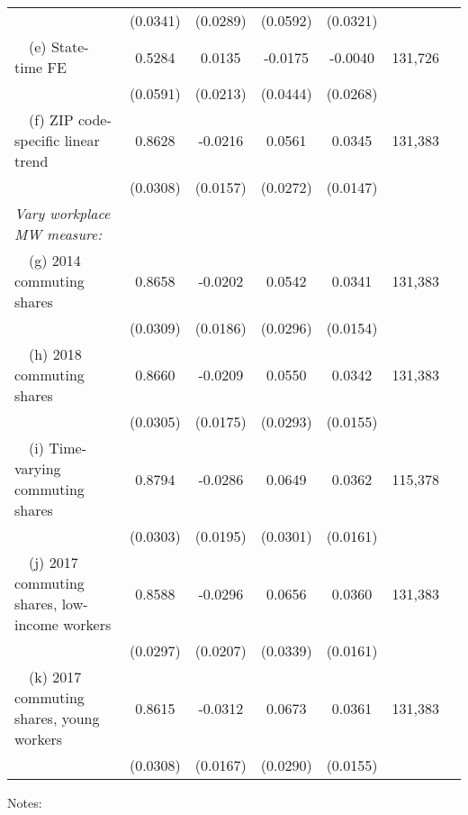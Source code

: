 \begin{table}
\begin{tabular}{@{}lcccccc@{}}
                                                             & (0.0341) & (0.0289) & (0.0592) & (0.0321) &      \\
        $\quad$(e) State-time FE                             &  0.5284  &  0.0135  &  -0.0175  &  -0.0040  & 131,726 \\
                                                             & (0.0591) & (0.0213) & (0.0444) & (0.0268) &      \\
        $\quad$(f) ZIP code-specific linear trend            &  0.8628  &  -0.0216  &  0.0561  &  0.0345  & 131,383 \\
                                                             & (0.0308) & (0.0157) & (0.0272) & (0.0147) &      \\
        \textit{Vary workplace MW measure:}                  &       &       &       &       &      \\
        $\quad$(g) 2014 commuting shares                     &  0.8658  &  -0.0202  &  0.0542  &  0.0341  & 131,383 \\
                                                             & (0.0309) & (0.0186) & (0.0296) & (0.0154) &      \\
        $\quad$(h) 2018 commuting shares                     &  0.8660  &  -0.0209  &  0.0550  &  0.0342  & 131,383 \\
                                                             & (0.0305) & (0.0175) & (0.0293) & (0.0155) &      \\
        $\quad$(i) Time-varying commuting shares             &  0.8794  &  -0.0286  &  0.0649  &  0.0362  & 115,378 \\
                                                             & (0.0303) & (0.0195) & (0.0301) & (0.0161) &      \\
        $\quad$(j) 2017 commuting shares, low-income workers &  0.8588  &  -0.0296  &  0.0656  &  0.0360  & 131,383 \\
                                                             & (0.0297) & (0.0207) & (0.0339) & (0.0161) &      \\
        $\quad$(k) 2017 commuting shares, young workers      &  0.8615  &  -0.0312  &  0.0673  &  0.0361  & 131,383 \\
                                                             & (0.0308) & (0.0167) & (0.0290) & (0.0155) &      \\ \bottomrule
    \end{tabular}

    \begin{minipage}{.95\textwidth} \footnotesize
        \vspace{2mm}
        Notes: 
        
    \end{minipage}
\end{table}
